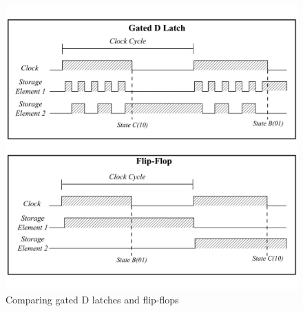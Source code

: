 \begin{figure}[ht]
    \begin{center}\includegraphics[scale=0.8]{Figures/TrafficLightClock.png}\end{center}
    \caption[Gated D Latches and flip-flops]{Comparing gated D latches and flip-flops}
    \label{fig::TrafficLightClock}
\end{figure}

